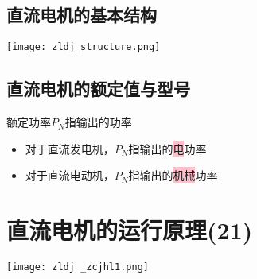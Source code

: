 \documentclass[blue]{elegantnote}
\begin{document}
\section{直流电机的基本结构}
\begin{center}
	\texttt{[image: zldj\_structure.png]}
\end{center}
\section{直流电机的额定值与型号}
额定功率$P_{N}$指输出的功率
\begin{itemize}
	\item 对于直流发电机，$P_{N}$指输出的\colorbox{pink}{电}功率
	\item	对于直流电动机，$P_{N}$指输出的\colorbox{pink}{机械}功率
\end{itemize}


\chapter{直流电机的运行原理(21)}
\begin{center}
	\texttt{[image: zldj \_zcjhl1.png]}
\end{center}
\end{document}
